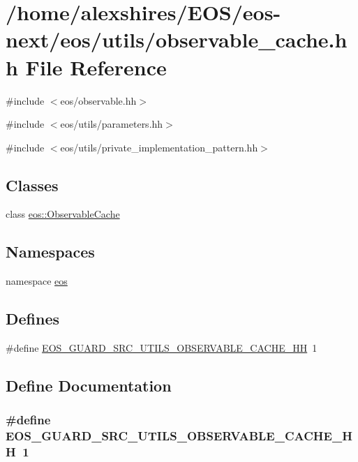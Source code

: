 \hypertarget{observable__cache_8hh}{
\section{/home/alexshires/EOS/eos-\/next/eos/utils/observable\_\-cache.hh File Reference}
\label{observable__cache_8hh}
}
{\ttfamily \#include $<$eos/observable.hh$>$}\par
{\ttfamily \#include $<$eos/utils/parameters.hh$>$}\par
{\ttfamily \#include $<$eos/utils/private\_\-implementation\_\-pattern.hh$>$}\par
\subsection*{Classes}
\begin{DoxyCompactItemize}
\item 
class \hyperlink{classeos_1_1ObservableCache}{eos::ObservableCache}
\end{DoxyCompactItemize}
\subsection*{Namespaces}
\begin{DoxyCompactItemize}
\item 
namespace \hyperlink{namespaceeos}{eos}
\end{DoxyCompactItemize}
\subsection*{Defines}
\begin{DoxyCompactItemize}
\item 
\#define \hyperlink{observable__cache_8hh_a6c94a37b947cd51d6745ff3e6ef9ee85}{EOS\_\-GUARD\_\-SRC\_\-UTILS\_\-OBSERVABLE\_\-CACHE\_\-HH}~1
\end{DoxyCompactItemize}


\subsection{Define Documentation}
\hypertarget{observable__cache_8hh_a6c94a37b947cd51d6745ff3e6ef9ee85}{
\subsubsection[{EOS\_\-GUARD\_\-SRC\_\-UTILS\_\-OBSERVABLE\_\-CACHE\_\-HH}]{\setlength{\rightskip}{0pt plus 5cm}\#define EOS\_\-GUARD\_\-SRC\_\-UTILS\_\-OBSERVABLE\_\-CACHE\_\-HH~1}}
\label{observable__cache_8hh_a6c94a37b947cd51d6745ff3e6ef9ee85}
